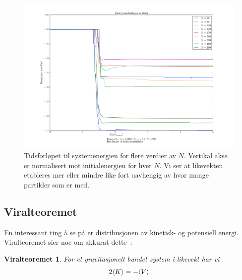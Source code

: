 \documentclass[11pt]{article}
\newtheorem*{viralthm}{Viralteoremet}
\begin{document}
\begin{figure}[!ht]
  \centering
  \includegraphics[width=\textwidth]{../fig/energy_plot_with_ejection_many_N.png}
  \caption{\label{fig:energy-many-N} Tidsforløpet til systemenergien
    for flere verdier av $N$. Vertikal akse er normalisert mot
    initialenergien for hver $N$. Vi ser at likevekten etableres mer eller
  mindre like fort uavhengig av hvor mange partikler som er med.}
\end{figure}
\begin{multicols}{2}



\subsection{Viralteoremet}
En interessant ting å se på er distribusjonen av kinetisk- og
potensiell energi. Viralteoremet sier noe om akkurat dette~\cite{viralteoremet-wiki}:

\begin{viralthm}
  For et gravitasjonelt bundet system i likevekt har vi 
\begin{align}
  2\langle K \rangle = -\langle V \rangle
\end{align}
\end{viralthm} 

\end{multicols}
\end{document}
